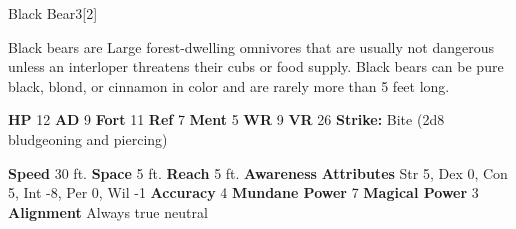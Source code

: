       
  \begin{monsubsection}{Black Bear}{3}[2]
    \vspace{-1em}\vspace{-1em}
    \vspace{0em}

    
            Black bears are Large forest-dwelling omnivores that are usually not dangerous unless an interloper threatens their cubs or food supply.
            Black bears can be pure black, blond, or cinnamon in color and are rarely more than 5 feet long.
          

    \begin{spellcontent}
      \begin{spelltargetinginfo}
        \pari \textbf{HP} 12 \monsep
          \textbf{AD} 9 \monsep
          \textbf{Fort} 11 \monsep
          \textbf{Ref} 7 \monsep
          \textbf{Ment} 5
        \pari \textbf{WR} 9 \monsep
        \textbf{VR} 26
        \pari \textbf{Strike:}
            Bite  (2d8 bludgeoning and piercing)
      \end{spelltargetinginfo}
    \end{spellcontent}
    \begin{monsterfooter}
      \pari \textbf{Speed} 30 ft. \monsep
        \textbf{Space} 5 ft. \monsep
        \textbf{Reach} 5 ft.
      \pari \textbf{Awareness} 
      \pari \textbf{Attributes}
        Str 5, Dex 0,
        Con 5, Int -8,
        Per 0, Wil -1
      \pari \textbf{Accuracy} 4 \monsep
        \textbf{Mundane Power} 7 \monsep
      \textbf{Magical Power} 3
      \pari \textbf{Alignment} Always true neutral
    \end{monsterfooter}
  \end{monsubsection}
  
  

